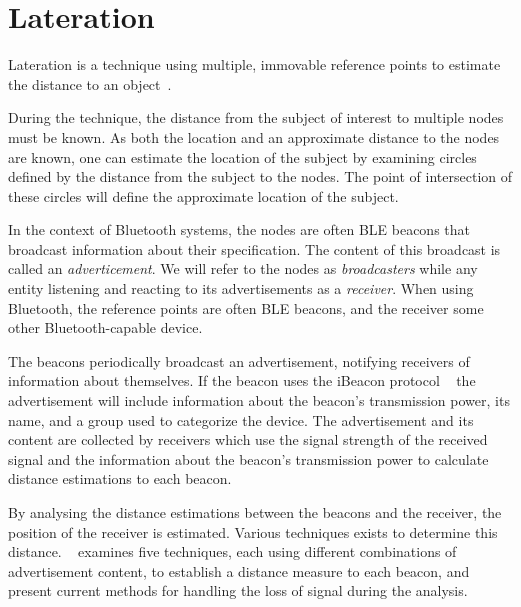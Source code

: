 \section{Lateration}
Lateration is a technique using multiple, immovable reference points to estimate the distance to an object~\cite{presence_ble_review}.

During the technique, the distance from the subject of interest to multiple nodes must be known. 
As both the location and an approximate distance to the nodes are known, one can estimate the location of the subject by examining circles defined by the distance from the subject to the nodes.
The point of intersection of these circles will define the approximate location of the subject.\cite{laterationExplanation}  

In the context of Bluetooth systems, the nodes are often BLE beacons that broadcast information about their specification. 
The content of this broadcast is called an \textit{adverticement}. 
We will refer to the nodes as \textit{broadcasters} while any entity listening and reacting to its advertisements as a \textit{receiver}.
When using Bluetooth, the reference points are often BLE beacons, and the receiver some other Bluetooth-capable device.~\cite{apple2023ibeacon} 

The beacons periodically broadcast an advertisement, notifying receivers of information about themselves. 
If the beacon uses the iBeacon protocol ~\cite{apple2023ibeacon} the advertisement will include information about the beacon's transmission power, its name, and a group used to categorize the device.
The advertisement and its content are collected by receivers which use the signal strength of the received signal and the information about the beacon's transmission power to calculate distance estimations to each beacon. 

By analysing the distance estimations between the beacons and the receiver, the position of the receiver is estimated.
Various techniques exists to determine this distance.
\citeauthor{presence_ble_review}~\cite{presence_ble_review} examines five techniques, each using different combinations of advertisement content, to establish a distance measure to each beacon, and present current methods for handling the loss of signal during the analysis.

